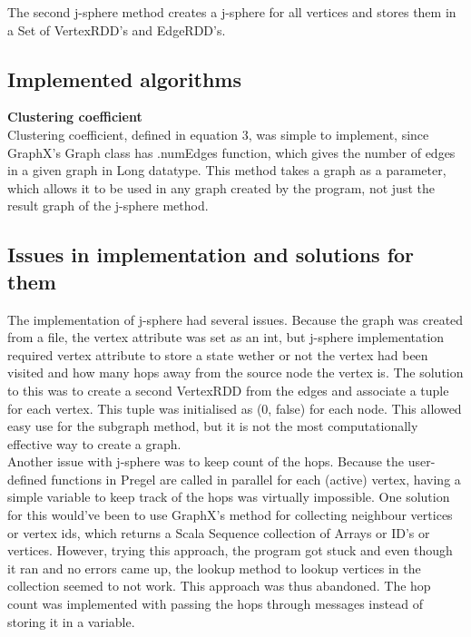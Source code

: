 \documentclass{article}
\theoremstyle{definition}
\begin{document}
The second j-sphere method creates a j-sphere for all vertices and stores them in a Set of VertexRDD's and EdgeRDD's. 

\subsection{Implemented algorithms}

\textbf{Clustering coefficient} \\
Clustering coefficient, defined in equation 3, was simple to implement, since GraphX's Graph class has .numEdges function, which gives the number of edges in a given graph in Long datatype. This method takes a graph as a parameter, which allows it to be used in any graph created by the program, not just the result graph of the j-sphere method. \\

\textbf{}

\textbf{}

\textbf{}



\subsection{Issues in implementation and solutions for them}


The implementation of j-sphere had several issues. Because the graph was created from a file, the vertex attribute was set as an int, but j-sphere implementation required vertex attribute to store a state wether or not the vertex had been visited and how many hops away from the source node the vertex is. The solution to this was to create a second VertexRDD from the edges and associate a tuple for each vertex. This tuple was initialised as (0, false) for each node. This allowed easy use for the subgraph method, but it is not the most computationally effective way to create a graph. \\

Another issue with j-sphere was to keep count of the hops. Because the user-defined functions in Pregel are called in parallel for each (active) vertex, having a simple variable to keep track of the hops was virtually impossible. One solution for this would've been to use GraphX's method for collecting neighbour vertices or vertex ids, which returns a Scala Sequence collection of Arrays or ID's or vertices. However, trying this approach, the program got stuck and even though it ran and no errors came up, the lookup method to lookup vertices in the collection seemed to not work. This approach was thus abandoned. The hop count was implemented with passing the hops through messages instead of storing it in a variable. \\
\end{document}
